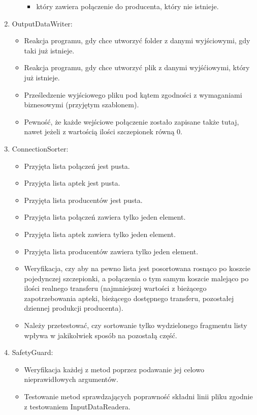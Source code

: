 \documentclass[a4paper]{article}
\begin{document}
\begin{enumerate}
\begin{itemize}
\begin{itemize}
		\item który zawiera połączenie do producenta, który nie istnieje.
		\end{itemize}
	\end{itemize}
\item OutputDataWriter:
	\begin{itemize}
	\item Reakcja programu, gdy chce utworzyć folder z danymi wyjściowymi, gdy taki już istnieje.
	\item Reakcja programu, gdy chce utworzyć plik z danymi wyjśćiowymi, który już istnieje.
	\item Prześledzenie wyjściowego pliku pod kątem zgodności z wymaganiami biznesowymi (przyjętym szablonem).
	\item Pewność, że każde wejściowe połączenie zostało zapisane także tutaj, nawet jeżeli z wartością ilości szczepionek równą 0.
	\end{itemize}
\item ConnectionSorter:
	\begin{itemize}
	\item Przyjęta lista połączeń jest pusta.
	\item Przyjęta lista aptek jest pusta.
	\item Przyjęta lista producentów jest pusta.
	\item Przyjęta lista połączeń zawiera tylko jeden element.
	\item Przyjęta lista aptek zawiera tylko jeden element.
	\item Przyjęta lista producentów zawiera tylko jeden element.
	\item Weryfikacja, czy aby na pewno lista jest posortowana rosnąco po koszcie pojedynczej szczepionki, a połączenia o tym samym koszcie malejąco po ilości realnego transferu (najmniejszej wartości z bieżącego zapotrzebowania apteki, bieżącego dostępnego transferu, pozostałej dziennej produkcji producenta).
	\item Należy przetestować, czy sortowanie tylko wydzielonego fragmentu listy wpływa w jakikolwiek sposób na pozostałą część.
	\end{itemize}
\item SafetyGuard:
	\begin{itemize}
	\item Weryfikacja każdej z metod poprzez podawanie jej celowo nieprawidłowych argumentów.
	\item Testowanie metod sprawdzających poprawność składni linii pliku zgodnie z testowaniem InputDataReadera.

\end{itemize}
\end{enumerate}
\end{document}
